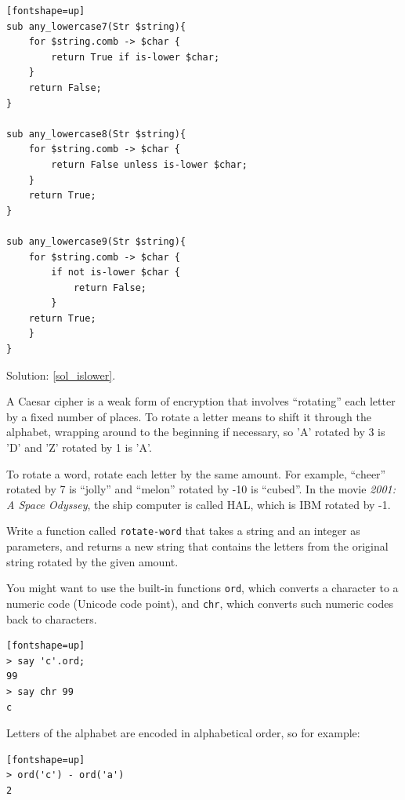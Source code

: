 \begin{exercise}
\begin{verbatim}[fontshape=up]
sub any_lowercase7(Str $string){
    for $string.comb -> $char {
        return True if is-lower $char;
    }
    return False;
}

sub any_lowercase8(Str $string){
    for $string.comb -> $char {
        return False unless is-lower $char;
    }
    return True;
}

sub any_lowercase9(Str $string){
    for $string.comb -> $char {
        if not is-lower $char {
            return False;
        }
    return True;
    }
}
\end{verbatim}

Solution: \ref{sol_islower}.

\end{exercise}


\begin{exercise}

\label{rotate}
A Caesar cipher is a weak form of encryption that involves ``rotating'' each
letter by a fixed number of places.  To rotate a letter means
to shift it through the alphabet, wrapping around to the beginning if
necessary, so 'A' rotated by 3 is 'D' and 'Z' rotated by 1 is 'A'.

To rotate a word, rotate each letter by the same amount.
For example, ``cheer'' rotated by 7 is ``jolly'' and ``melon'' rotated
by -10 is ``cubed''.  In the movie {\em 2001: A Space Odyssey}, the 
ship computer is called HAL, which is IBM rotated by -1.

Write a function called \verb"rotate-word"
that takes a string and an integer as parameters, and returns
a new string that contains the letters from the original string
rotated by the given amount.  

You might want to use the built-in functions {\tt ord}, which 
converts a character to a numeric code (Unicode code point), and 
{\tt chr}, which converts such numeric codes back to characters.

\begin{verbatim}[fontshape=up]
> say 'c'.ord;
99
> say chr 99
c
\end{verbatim}
%

Letters of the alphabet are encoded in alphabetical
order, so for example:

\begin{verbatim}[fontshape=up]
> ord('c') - ord('a')
2
\end{verbatim}


\end{exercise}
